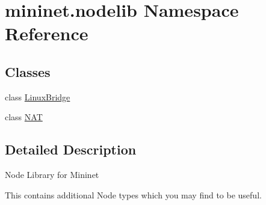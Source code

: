\hypertarget{namespacemininet_1_1nodelib}{\section{mininet.\-nodelib Namespace Reference}
\label{namespacemininet_1_1nodelib}
}
\subsection*{Classes}
\begin{DoxyCompactItemize}
\item 
class \hyperlink{classmininet_1_1nodelib_1_1LinuxBridge}{Linux\-Bridge}
\item 
class \hyperlink{classmininet_1_1nodelib_1_1NAT}{N\-A\-T}
\end{DoxyCompactItemize}


\subsection{Detailed Description}
\begin{DoxyVerb}Node Library for Mininet

This contains additional Node types which you may find to be useful.
\end{DoxyVerb}
 